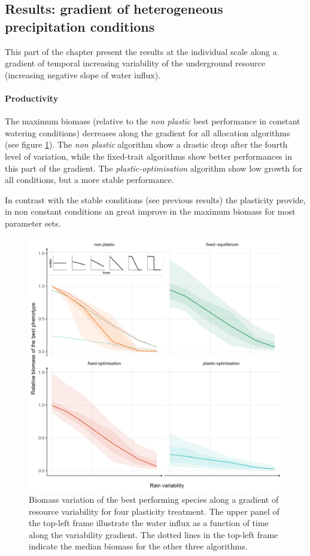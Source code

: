 \subsection{Results: gradient of heterogeneous precipitation conditions}

This part of the chapter present the results at the individual scale along a gradient of temporal increasing variability of the underground resource (increasing negative slope of water influx).

\paragraph{Productivity}
The maximum biomass (relative to the \textit{non plastic} best performance in constant watering conditions) decreases along the gradient for all allocation algorithms (see figure \ref{fig:variable_BM}). The \textit{non plastic} algorithm show a drastic drop after the fourth level of variation, while the fixed-trait algorithms show better performances in this part of the gradient. The \textit{plastic-optimisation} algorithm show low growth for all conditions, but a more stable performance.

In contrast with the stable conditions (see previous results) the plasticity provide, in non constant conditions an great improve in the maximum biomass for most parameter sets. 

\begin{figure}\label{fig:variable_BM}
\includegraphics[width = \textwidth]{./2_PP/Figures/Variable/var_relnone_BM_trend.pdf}
\caption[Biomass variations along a gradient of resource variability]{Biomass variation of the best performing species along a gradient of resource variability for four plasticity treatment. The upper panel of the top-left frame illustrate the water influx as a function of time along the variability gradient. The dotted lines in the top-left frame indicate the median biomass for the other three algorithms. }
\end{figure}

